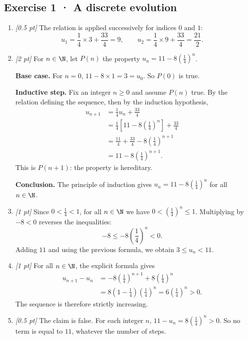 \subsection*{Exercise 1 · A discrete evolution}\begin{enumerate}

\item \textit{[0.5 pt]} The relation is applied successively for indices $0$ and $1$:\[u_1=\frac{1}{4}\times 3+\frac{33}{4}=9,\qquad u_2=\frac{1}{4}\times 9+\frac{33}{4}=\frac{21}{2}.\]

\item \textit{[2 pt]} For $n\in\N$, let $P(n)$ the property $u_n=11-8\left(\frac{1}{4}\right)^n$.
\par\smallskip\textbf{Base case.} For $n=0$, $11-8\times1=3=u_0$. So $P(0)$ is true.
\par\smallskip\textbf{Inductive step.} Fix an integer $n\ge0$ and assume $P(n)$ true. By the relation defining the sequence, then by the induction hypothesis,
\[\begin{aligned}u_{n+1}&=\frac{1}{4}u_n+\frac{33}{4}\\
&=\frac{1}{4}\left[11-8\left(\frac{1}{4}\right)^n\right]+\frac{33}{4}\\
&=\frac{11}{4}+\frac{33}{4}-8\left(\frac{1}{4}\right)^{n+1}\\
&=11-8\left(\frac{1}{4}\right)^{n+1}.
\end{aligned}\]
This is $P(n+1)$: the property is hereditary.
\par\smallskip\textbf{Conclusion.} The principle of induction gives $u_n=11-8\left(\frac{1}{4}\right)^n$ for all $n\in\N$.

\item \textit{[1 pt]} Since $0<\frac{1}{4}<1$, for all $n\in\N$ we have $0<(\frac{1}{4})^n\le1$. Multiplying by $-8<0$ reverses the inequalities:
\[-8\le-8(\frac{1}{4})^n<0.\]
Adding $11$ and using the previous formula, we obtain $3\le u_n<11$.

\item \textit{[1 pt]} For all $n\in\N$, the explicit formula gives
\[\begin{aligned}u_{n+1}-u_n&=-8(\frac{1}{4})^{n+1}+8(\frac{1}{4})^n\\&=8(1-\frac{1}{4})(\frac{1}{4})^n=6(\frac{1}{4})^n>0.\end{aligned}\]
The sequence is therefore strictly increasing.

\item \textit{[0.5 pt]} The claim is false. For each integer $n$, $11-u_n=8(\frac{1}{4})^n>0$. So no term is equal to $11$, whatever the number of steps.

\end{enumerate}


